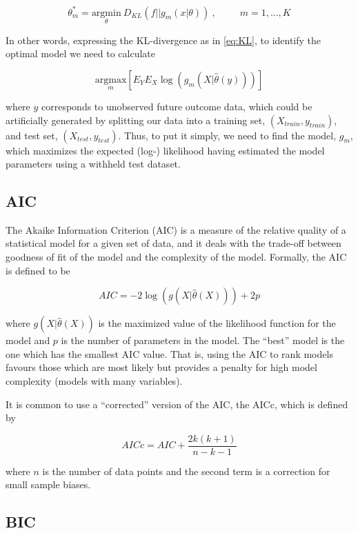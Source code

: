 $$ \theta^*_m = \underset{\theta}{\text{argmin}}~D_{KL}(f || g_m(x | \theta))~, ~~~~~~~~~~~m = 1, ..., K$$

In other words, expressing the KL-divergence as in \ref{eq:KL}, to identify the optimal model we need to calculate

$$\underset{m}{\text{argmax}} \left[ E_Y E_X \log (g_m(X | \hat{\theta}(y))) \right]$$

where $y$ corresponds to unobserved future outcome data, which could be artificially generated by splitting our data into a training set, $(X_{train}, y_{train})$, and test set, $(X_{test}, y_{test})$. Thus, to put it simply, we need to find the model, $g_m$, which maximizes the expected (log-) likelihood having estimated the model parameters using a withheld test dataset.









\subsection*{AIC}

The Akaike Information Criterion (AIC) is a measure
of the relative quality of a statistical model for a given set of data, and it deals with the trade-off between goodness of fit of the model and the complexity of the model. Formally, the AIC is defined to be

$$AIC = -2\log(g(X | \hat{\theta}(X))) + 2p$$

where $g(X|\hat{\theta}(X))$ is the maximized value of the likelihood function for the model and $p$ is the number of parameters in the model. The ``best'' model is the one which has the smallest AIC value. That is, using the AIC to rank models favours those which are most likely but provides a penalty for high model complexity (models with many variables).

It is common to use a ``corrected'' version of the AIC, the AICc, which is defined by

$$AICc =AIC  + \frac{2k(k+1)}{n - k -1}$$

where $n$ is the number of data points and the second term is a correction for small sample biases. 







\subsection*{BIC}


